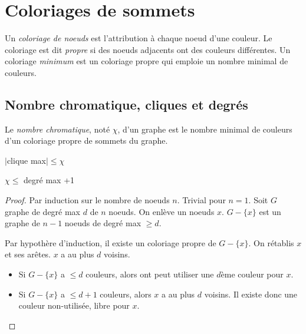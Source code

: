 \section{Coloriages de sommets}

\begin{mydef}
  Un \emph{coloriage de noeuds} est l’attribution à chaque noeud d’une couleur.
  Le coloriage est dit \emph{propre} si des noeuds adjacents ont des couleurs différentes. 
  Un coloriage \emph{minimum} est un coloriage propre qui emploie un nombre minimal de couleurs.
\end{mydef}

\subsection{Nombre chromatique, cliques et degrés}
\begin{mydef}
  Le \emph{nombre chromatique}, noté $\chi$, d’un graphe est le nombre minimal de couleurs d’un coloriage propre de sommets du graphe.
\end{mydef}

\begin{mytheo}
  $|$clique max$| \leq \chi$
\end{mytheo}

\begin{mytheo}
  $\chi \leq $ degré max +1
  \begin{proof}
    Par induction sur le nombre de noeuds $n$. 
    Trivial pour $n = 1$.
    Soit $G$ graphe de degré max $d$ de $n$ noeuds. On enlève un noeuds $x$. $G-\{x\}$ est un graphe de $n-1$ noeuds de degré max $\geq d$.
    
    Par hypothère d'induction, il existe un coloriage propre de $G-\{x\}$.
    On rétablis $x$ et ses arêtes. $x$ a au plus $d $ voisins.
    
    \begin{itemize}
    \item Si  $G-\{x\}$ a $\leq d$ couleurs, alors ont peut utiliser une $d$ème couleur pour $x$.
    \item  Si $G-\{x\}$ a $\leq d+1$ couleurs, alors $x$ a au plus $d$ voisins. Il existe donc une couleur non-utilisée, libre pour $x$.
    \end{itemize}
  \end{proof}
\end{mytheo}
